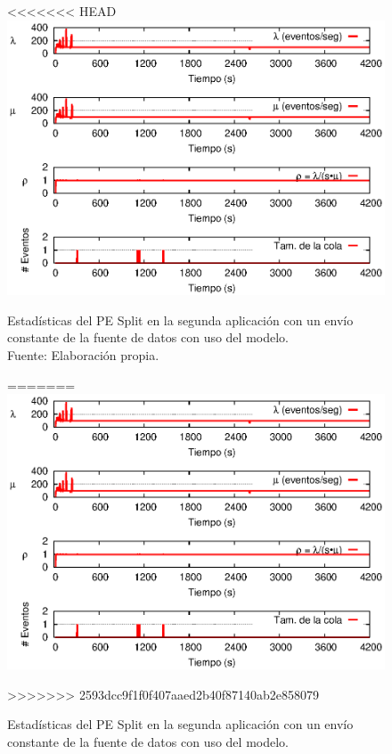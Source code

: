 \begin{figure}[!ht]
<<<<<<< HEAD
    \centering
    \captionsetup{justification=centering}
    \includegraphics[scale=1]{images/exp/app2/uniform/cm/statusSplitPE.eps}
    \caption[Estadísticas del PE Split en la segunda aplicación con un envío constante de la fuente de datos con uso del modelo.]{Estadísticas del PE Split en la segunda aplicación con un envío constante de la fuente de datos con uso del modelo.\\Fuente: Elaboración propia.}
=======
\centering
    \includegraphics[scale=1.1]{images/exp/app2/uniform/cm/statusSplitPE.eps}
    \caption{Estad\'isticas del PE Split en la segunda aplicaci\'on con un env\'io constante de la fuente de datos con uso del modelo.}
>>>>>>> 2593dcc9f1f0f407aaed2b40f87140ab2e858079
    \label{fig:app2-uniform-statusSplitPE-cm}
\end{figure}

